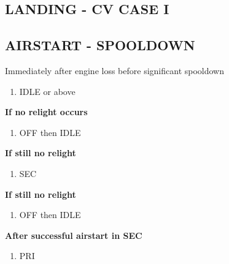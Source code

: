 \documentclass[8pt,usenames,dvipsnames,twoside]{article}
\begin{document}
\begin{multicols*}{2}
		\subsection{LANDING - CV CASE I}
		
		\clearpage
		\subsection{AIRSTART - SPOOLDOWN}
		Immediately after engine loss before significant spooldown
		\begin{enumerate}
			\item {} \dotfill IDLE or above
		\end{enumerate}
		\textbf{If no relight occurs}
		\begin{enumerate}[resume]
			\item {} \dotfill OFF then IDLE 
		\end{enumerate}
		\textbf{If still no relight}
		\begin{enumerate}[resume]
			\item {} \dotfill SEC
		\end{enumerate}
		\textbf{If still no relight}
		\begin{enumerate}[resume]
			\item {} \dotfill OFF then IDLE 
		\end{enumerate}
		\textbf{After successful airstart in SEC}
		\begin{enumerate}[resume]
			\item {} \dotfill PRI
		\end{enumerate}
	

\end{multicols*}
\end{document}
